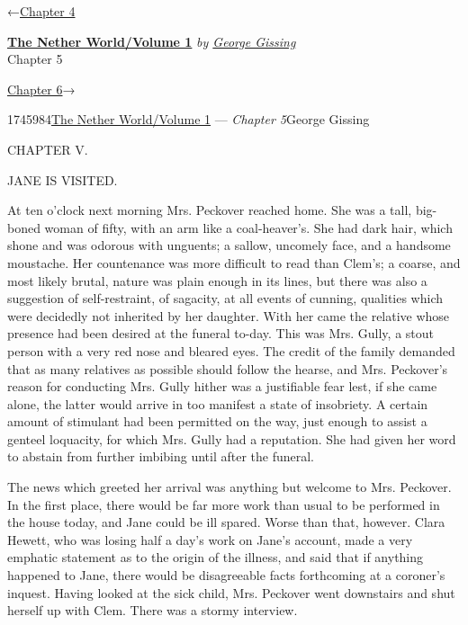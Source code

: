 \hypertarget{headerContainer}{}
\hypertarget{navigationHeader}{}
\protect\hypertarget{headerprevious}{}{←\href{/wiki/The_Nether_World/Volume_1/Chapter_4}{Chapter
4}}

\textbf{\protect\hypertarget{header_title_text}{}{\href{/w/index.php?title=The_Nether_World/Volume_1\&action=edit\&redlink=1}{The
Nether World/Volume 1}}} \emph{by
\href{/wiki/Author:George_Gissing}{\protect\hypertarget{header_author_text}{}{{George
Gissing}}}}\\
\protect\hypertarget{header_section_text}{}{Chapter 5}

\protect\hypertarget{headernext}{}{\href{/wiki/The_Nether_World/Volume_1/Chapter_6}{Chapter
6}→}

\hypertarget{navigationNotes}{}

\hypertarget{ws-data}{}
\protect\hypertarget{ws-article-id}{}{1745984}\protect\hypertarget{ws-title}{}{\href{/w/index.php?title=The_Nether_World/Volume_1\&action=edit\&redlink=1}{The
Nether World/Volume 1} --- \emph{Chapter
5}}\protect\hypertarget{ws-author}{}{George Gissing}

{\protect\hypertarget{92}{}{}}

{CHAPTER V.}

JANE IS VISITED.

At ten o'clock next morning Mrs. Peckover reached home. She was a tall,
big-boned woman of fifty, with an arm like a coal-heaver's. She had dark
hair, which shone and was odorous with unguents; a sallow, uncomely
face, and a handsome moustache. Her countenance was more difficult to
read than Clem's; a coarse, and most likely brutal, nature was plain
enough in its lines, but there was also a suggestion of self-restraint,
of sagacity, at all events of cunning, qualities which were decidedly
not inherited by her daughter. With her came the relative whose presence
had been desired at the funeral to-day. This was Mrs. Gully, a stout
person with a very red nose and bleared eyes. The
{\protect\hypertarget{93}{}{}}credit of the family demanded that as many
relatives as possible should follow the hearse, and Mrs. Peckover's
reason for conducting Mrs. Gully hither was a justifiable fear lest, if
she came alone, the latter would arrive in too manifest a state of
insobriety. A certain amount of stimulant had been permitted on the way,
just enough to assist a genteel loquacity, for which Mrs. Gully had a
reputation. She had given her word to abstain from further imbibing
until after the funeral.

The news which greeted her arrival was anything but welcome to Mrs.
Peckover. In the first place, there would be far more work than usual to
be performed in the house today, and Jane could be ill spared. Worse
than that, however. Clara Hewett, who was losing half a day's work on
Jane's account, made a very emphatic statement as to the origin of the
illness, and said that if anything happened to Jane, there would be
disagreeable facts forthcoming at a coroner's inquest. Having looked at
the sick child, Mrs. Peckover went downstairs and shut
{\protect\hypertarget{94}{}{}}herself up with Clem. There was a stormy
interview.

